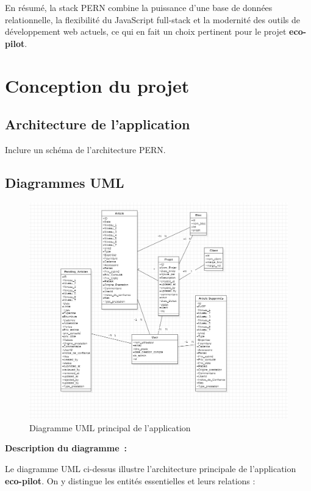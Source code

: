 \documentclass[12pt,a4paper]{report}
\begin{document}
En résumé, la stack PERN combine la puissance d’une base de données relationnelle, la flexibilité du JavaScript full-stack et la modernité des outils de développement web actuels, ce qui en fait un choix pertinent pour le projet \textbf{eco-pilot}.

\chapter{Conception du projet}
\section{Architecture de l’application}
Inclure un schéma de l’architecture PERN.  

\section{Diagrammes UML}

\begin{figure}[H]
    \centering
    \includegraphics[width=0.5\linewidth]{image.png}
    \caption{Diagramme UML principal de l’application}
    \label{fig:placeholder}
\end{figure}

\textbf{Description du diagramme~:}

Le diagramme UML ci-dessus illustre l’architecture principale de l’application \textbf{eco-pilot}. On y distingue les entités essentielles et leurs relations :
\end{document}
